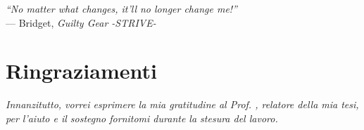 \cleardoublepage
{}
{}

\begin{flushright}{
    \slshape
    ``No matter what changes, it'll no longer change me!''} \\
    \medskip
    --- Bridget, \textit{Guilty Gear -STRIVE-}
\end{flushright}


\bigskip

\begingroup
\let\clearpage\relax
\let\cleardoublepage\relax
\let\cleardoublepage\relax

\chapter*{Ringraziamenti}

\noindent \textit{Innanzitutto, vorrei esprimere la mia gratitudine al Prof. \myProf, relatore della mia tesi, per l'aiuto e il sostegno fornitomi durante la stesura del lavoro.}\\

